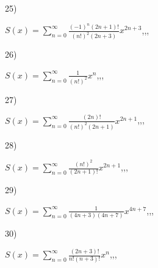 \documentclass[11pt, ukrainian]{article}
\begin{document}
\par
\vspace{0.9cm}
25) \space 
{%
{$S(x)=\sum\limits_{n=0}^{\infty}{\frac{{(-1)^n}(2n+1)!}{{(n!)^2}(2n+3)}}{x^{{2n+3}}}$},,, \par \smallskip  
}
\par
\vspace{0.9cm}
26) \space 
{%
{$S(x)=\sum\limits_{n=0}^{\infty}{\frac{1}{(n!)^2}}{x^{{n}}}$},,, \par \smallskip  
}
\par
\vspace{0.9cm}
27) \space 
{%
{$S(x)=\sum\limits_{n=0}^{\infty}{\frac{(2n)!}{(n!)^2(2n+1)}}{x^{{2n+1}}}$},,, \par \smallskip  
}
\par
\vspace{0.9cm}
28) \space 
{%
{$S(x)=\sum\limits_{n=0}^{\infty}{\frac{(n!)^2}{(2n+1)!}}{x^{{2n+1}}}$},,, \par \smallskip  
}
\par
\vspace{0.9cm}
29) \space 
{%
{$S(x)=\sum\limits_{n=0}^{\infty}{\frac{1}{(4n+3)(4n+7)}}{x^{{4n+7}}}$},,, \par \smallskip  
}
\par
\vspace{0.9cm}
30) \space 
{%
{$S(x)=\sum\limits_{n=0}^{\infty}{\frac{(2n+3)!}{n!(n+3)!}}{x^{n}}$},,, \par \smallskip  
}
\end{document}
